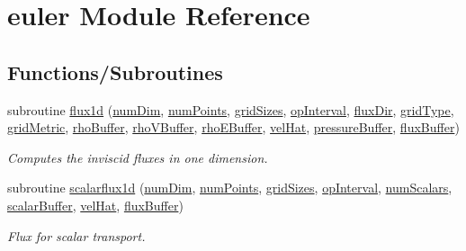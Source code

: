 \hypertarget{namespaceeuler}{}\section{euler Module Reference}
\label{namespaceeuler}
\subsection*{Functions/\+Subroutines}
\begin{DoxyCompactItemize}
\item 
subroutine \hyperlink{namespaceeuler_a75d1a7e992d0b046ee381c90d22d4c44}{flux1d} (\hyperlink{SATKernels_8H_a680185db8546de161968dabace9e94f1}{num\+Dim}, \hyperlink{ViscidKernels_8H_adf0bf75d0875d1bb42a5348bee7b7bfd}{num\+Points}, \hyperlink{ViscidKernels_8H_a969a5d6106eec8b7096250b27865b9ba}{grid\+Sizes}, \hyperlink{WENOKernels_8H_a23d86f4608a92738225f87574392b273}{op\+Interval}, \hyperlink{ViscidKernels_8H_a466b72ae195460a9c9f2d36373803dc5}{flux\+Dir}, \hyperlink{WENOKernels_8H_ab35a6cf312bb0fddda7097a149c3e946}{grid\+Type}, \hyperlink{WENOKernels_8H_a901f07fa4e3f966a2f6951d6c5974e89}{grid\+Metric}, \hyperlink{WENOKernels_8H_a7f8551332dfedc9c12724ab3903db88c}{rho\+Buffer}, \hyperlink{WENOKernels_8H_aaddaafee4b407fa52d0756171ec50a51}{rho\+V\+Buffer}, \hyperlink{WENOKernels_8H_a355f99edd58be395aedbe083ffca12b0}{rho\+E\+Buffer}, \hyperlink{MetricKernels_8H_a05a5c93e8f43d622b504e02893ae3d66}{vel\+Hat}, \hyperlink{WENOKernels_8H_ad7fb6f5370938321db995446ba47c04b}{pressure\+Buffer}, \hyperlink{ViscidKernels_8H_abbdaff041c5151009f87fbae1b58e666}{flux\+Buffer})
\begin{DoxyCompactList}\small\item\em Computes the inviscid fluxes in one dimension. \end{DoxyCompactList}\item 
subroutine \hyperlink{namespaceeuler_ab9baf301102dd29f97d17d6550f7b527}{scalarflux1d} (\hyperlink{SATKernels_8H_a680185db8546de161968dabace9e94f1}{num\+Dim}, \hyperlink{ViscidKernels_8H_adf0bf75d0875d1bb42a5348bee7b7bfd}{num\+Points}, \hyperlink{ViscidKernels_8H_a969a5d6106eec8b7096250b27865b9ba}{grid\+Sizes}, \hyperlink{WENOKernels_8H_a23d86f4608a92738225f87574392b273}{op\+Interval}, \hyperlink{WENOKernels_8H_a653618c9ce0046e8ef3b30321ea41f98}{num\+Scalars}, \hyperlink{WENOKernels_8H_ae53b6c0ad2686009b00d987ad35f4810}{scalar\+Buffer}, \hyperlink{MetricKernels_8H_a05a5c93e8f43d622b504e02893ae3d66}{vel\+Hat}, \hyperlink{ViscidKernels_8H_abbdaff041c5151009f87fbae1b58e666}{flux\+Buffer})
\begin{DoxyCompactList}\small\item\em Flux for scalar transport. \end{DoxyCompactList}\end{DoxyCompactItemize}


